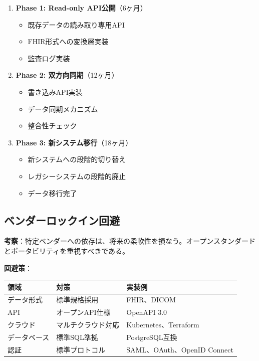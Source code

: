 \documentclass[
  a4paper,
  a4paper,
  11pt]{ltjsbook}
\providecommand{\tightlist}{%
  \setlength{\itemsep}{0pt}\setlength{\parskip}{0pt}}
\begin{document}
\begin{enumerate}
\def\labelenumi{\arabic{enumi}.}
\tightlist
\item
  \textbf{Phase 1: Read-only API公開}（6ヶ月）

  \begin{itemize}
  \tightlist
  \item
    既存データの読み取り専用API
  \item
    FHIR形式への変換層実装
  \item
    監査ログ実装
  \end{itemize}
\item
  \textbf{Phase 2: 双方向同期}（12ヶ月）

  \begin{itemize}
  \tightlist
  \item
    書き込みAPI実装
  \item
    データ同期メカニズム
  \item
    整合性チェック
  \end{itemize}
\item
  \textbf{Phase 3: 新システム移行}（18ヶ月）

  \begin{itemize}
  \tightlist
  \item
    新システムへの段階的切り替え
  \item
    レガシーシステムの段階的廃止
  \item
    データ移行完了
  \end{itemize}
\end{enumerate}

\subsection{ベンダーロックイン回避}\label{ux30d9ux30f3ux30c0ux30fcux30edux30c3ux30afux30a4ux30f3ux56deux907f}

\textbf{考察}：特定ベンダーへの依存は、将来の柔軟性を損なう。オープンスタンダードとポータビリティを重視すべきである。

\textbf{回避策}：

\begin{longtable}[]{@{}lll@{}}
\toprule\noalign{}
領域 & 対策 & 実装例 \\
\midrule\noalign{}
\endhead
\bottomrule\noalign{}
\endlastfoot
データ形式 & 標準規格採用 & FHIR、DICOM \\
API & オープンAPI仕様 & OpenAPI 3.0 \\
クラウド & マルチクラウド対応 & Kubernetes、Terraform \\
データベース & 標準SQL準拠 & PostgreSQL互換 \\
認証 & 標準プロトコル & SAML、OAuth、OpenID Connect \\
\end{longtable}
\end{document}
